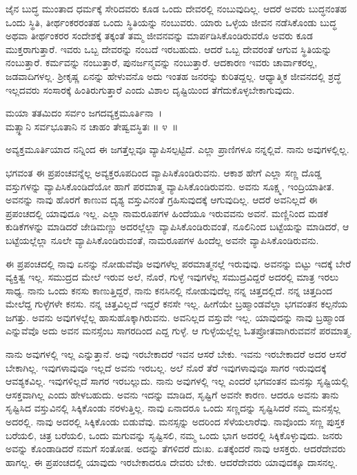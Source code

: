 ಜೈನ ಬುದ್ಧ ಮುಂತಾದ ಧರ್ಮಕ್ಕೆ ಸೇರಿದವರು ಕೂಡ ಒಂದು ದೇವರಲ್ಲಿ ನಂಬುವುದಿಲ್ಲ. ಆದರೆ ಅವರು ಬುದ್ಧನಂತಹ ಒಂದು ಸ್ಥಿತಿ, ತೀರ್ಥಂಕರರಂತಹ ಒಂದು ಸ್ಥಿತಿಯನ್ನು ನಂಬುವರು. ಯಾರು ಒಳ್ಳೆಯ ಜೀವನ ನಡೆಸಿಕೊಂಡು ಬುದ್ಧ ಅಥವಾ ತೀರ್ಥಂಕರರ ಸಂದೇಶಕ್ಕೆ ತಕ್ಕಂತೆ ತಮ್ಮ ಜೀವನವನ್ನು ಮಾರ್ಪಡಿಸಿಕೊಂಡಿರುವರೊ ಅವರು ಕೂಡ ಮುಕ್ತರಾಗುತ್ತಾರೆ. ಇವರು ಒಬ್ಬ ದೇವರನ್ನು ನಂಬದೆ ಇರಬಹುದು. ಆದರೆ ಒಬ್ಬ ದೇವರಂತೆ ಆಗುವ ಸ್ಥಿತಿಯನ್ನು ನಂಬುತ್ತಾರೆ. ಕರ್ಮವನ್ನು ನಂಬುತ್ತಾರೆ, ಪುನರ್ಜನ್ಮವನ್ನು ನಂಬುತ್ತಾರೆ. ಆದಕಾರಣ ಇವರು ಚಾರ್ವಾಕರಲ್ಲ, ಜಡವಾದಿಗಳಲ್ಲ. ಶ‍್ರೀಕೃಷ್ಣ ಏನನ್ನು ಹೇಳುವನೊ ಅದು ಇಂತಹ ಜನರನ್ನು ಕುರಿತದ್ದಲ್ಲ. ಆಧ್ಯಾತ್ಮಿಕ ಜೀವನದಲ್ಲಿ ಶ್ರದ್ಧೆ ಇಲ್ಲದವರು ಸಂಸಾರಕ್ಕೆ ಹಿಂತಿರುಗುತ್ತಾರೆ ಎಂದು ವಿಶಾಲ ದೃಷ್ಟಿಯಿಂದ ತೆಗೆದುಕೊಳ್ಳಬೇಕಾಗುವುದು.

\begin{shloka}
ಮಯಾ ತತಮಿದಂ ಸರ್ವಂ ಜಗದವ್ಯಕ್ತಮೂರ್ತಿನಾ~।\\ಮತ್ಸ್ಥಾನಿ ಸರ್ವಭೂತಾನಿ ನ ಚಾಹಂ ತೇಷ್ವವಸ್ಥಿತಃ \hfill॥ ೪~॥
\end{shloka}

\begin{artha}
ಅವ್ಯಕ್ತಮೂರ್ತಿಯಾದ ನನ್ನಿಂದ ಈ ಜಗತ್ತೆಲ್ಲವೂ ವ್ಯಾಪಿಸಲ್ಪಟ್ಟಿದೆ. ಎಲ್ಲಾ ಪ್ರಾಣಿಗಳೂ ನನ್ನಲ್ಲಿವೆ. ನಾನು ಅವುಗಳಲ್ಲಿಲ್ಲ.
\end{artha}

ಭಗವಂತ ಈ ಪ್ರಪಂಚವನ್ನೆಲ್ಲ ಅವ್ಯಕ್ತರೂಪದಿಂದ ವ್ಯಾಪಿಸಿಕೊಂಡಿರುವನು. ಆಕಾಶ ಹೇಗೆ ಎಲ್ಲಾ ಸಣ್ಣ ದೊಡ್ಡ ವಸ್ತುಗಳನ್ನು ವ್ಯಾಪಿಸಿಕೊಂಡಿದೆಯೋ ಹಾಗೆ ಪರಮಾತ್ಮ ವ್ಯಾಪಿಸಿಕೊಂಡಿರುವನು. ಅವನು ಸೂಕ್ಷ್ಮ, ಇಂದ್ರಿಯಾತೀತ. ಅವನನ್ನು ನಾವು ಹೊರಗೆ ಕಾಣುವ ದೃಶ್ಯ ವಸ್ತುವಿನಂತೆ ಗ್ರಹಿಸುವುದಕ್ಕೆ ಆಗುವುದಿಲ್ಲ. ಆದರೆ ಅವನಿಲ್ಲದೆ ಈ ಪ್ರಪಂಚದಲ್ಲಿ ಯಾವುದೂ ಇಲ್ಲ. ಎಲ್ಲಾ ನಾಮರೂಪಗಳ ಹಿಂದೆಯೂ ಇರುವವನು ಅವನೆ. ಮಣ್ಣಿನಿಂದ ಮಡಕೆ ಕುಡಿಕೆಗಳನ್ನು ಮಾಡಿದರೆ ಜೇಡಿಮಣ್ಣು ಅದರಲ್ಲೆಲ್ಲಾ ವ್ಯಾಪಿಸಿಕೊಂಡಿರುವಂತೆ, ನೂಲಿನಿಂದ ಬಟ್ಟೆಯನ್ನು ಮಾಡಿದರೆ, ಆ ಬಟ್ಟೆಯಲ್ಲೆಲ್ಲಾ ನೂಲೇ ವ್ಯಾಪಿಸಿಕೊಂಡಿರುವಂತೆ, ನಾಮರೂಪಗಳ ಹಿಂದೆಲ್ಲ ಅವನೇ ವ್ಯಾಪಿಸಿ\-ಕೊಂಡಿರುವನು.

ಈ ಪ್ರಪಂಚದಲ್ಲಿ ನಾವು ಏನನ್ನು ನೋಡುವೆವೊ ಅವುಗಳೆಲ್ಲ ಪರಮಾತ್ಮನಲ್ಲೆ ಇರುವುವು. ಅವನನ್ನು ಬಿಟ್ಟು ಇದಕ್ಕೆ ಬೇರೆ ವ್ಯಕ್ತಿತ್ವ ಇಲ್ಲ. ಸಮುದ್ರದ ಮೇಲೆ ಇರುವ ಅಲೆ, ನೊರೆ, ಗುಳ್ಳೆ ಇವುಗಳೆಲ್ಲ ಸಮುದ್ರವಿದ್ದರೆ ಅದರಲ್ಲಿ ಮಾತ್ರ ಇರಲು ಸಾಧ್ಯ. ನಾನು ಒಂದು ಕನಸು ಕಾಣುತ್ತಿದ್ದರೆ, ನಾನು ಕನಸಿನಲ್ಲಿ ನೋಡುವುದೆಲ್ಲ ನನ್ನ ಚಿತ್ತದಲ್ಲಿದೆ. ನನ್ನ ಚಿತ್ತದಿಂದ ಮೇಲೆದ್ದ ಗುಳ್ಳೆಗಳೇ ಕನಸು. ನನ್ನ ಚಿತ್ತವಿಲ್ಲದೆ ಇದ್ದರೆ ಕನಸೇ ಇಲ್ಲ. ಹೀಗೆಯೇ ಬ್ರಹ್ಮಾಂಡವೆಲ್ಲಾ ಭಗವಂತನ ಕಲ್ಪನೆಯ ಜಗತ್ತು. ಅವನು ಅವುಗಳಲ್ಲೆಲ್ಲ ಹಾಸುಹೊಕ್ಕಾಗಿರುವನು. ಅವನಿಲ್ಲದ ವಸ್ತುವೇ ಇಲ್ಲ. ಯಾವುದನ್ನು ನಾವು ಬ್ರಹ್ಮಾಂಡ ಎನ್ನುವೆವೊ ಅದು ಅವನ ಮನಸ್ಸೆಂಬ ಸಾಗರದಿಂದ ಎದ್ದ ಗುಳ್ಳೆ. ಆ ಗುಳ್ಳೆಯಲ್ಲೆಲ್ಲ ಓತಪ್ರೋತವಾಗಿರುವವನೆ ಪರಮಾತ್ಮ.

ನಾನು ಅವುಗಳಲ್ಲಿ ಇಲ್ಲ ಎನ್ನುತ್ತಾನೆ. ಅವು ಇರಬೇಕಾದರೆ ಇವನ ಆಸರೆ ಬೇಕು. ಇವನು ಇರಬೇಕಾದರೆ ಅದರ ಆಸರೆ ಬೇಕಾಗಿಲ್ಲ. ಇವುಗಳಾವುವೂ ಇಲ್ಲದೆ ಅವನು ಇರಬಲ್ಲ. ಅಲೆ ನೊರೆ ತೆರೆ ಇವುಗಳಾವುವೂ ಸಾಗರ ಇರುವುದಕ್ಕೆ ಆವಶ್ಯಕವಿಲ್ಲ. ಇವುಗಳಿಲ್ಲದೆ ಸಾಗರ ಇರಬಲ್ಲುದು. ನಾನು ಅವುಗಳಲ್ಲಿ ಇಲ್ಲ ಎಂದರೆ ಭಗವಂತನ ಮನಸ್ಸು ಸೃಷ್ಟಿಯಲ್ಲಿ ಆಸಕ್ತವಾಗಿಲ್ಲ ಎಂದು ಹೇಳಬಹುದು. ಅವನು ಇದನ್ನು ಮಾಡಿದ, ಸೃಷ್ಟಿಗೆ ಅವನೇ ಕಾರಣ. ಆದರೂ ಅವನು ತಾನು ಸೃಷ್ಟಿಸಿದ ವಸ್ತುವಿನಲ್ಲಿ ಸಿಕ್ಕಿಕೊಂಡು ನರಳುತ್ತಿಲ್ಲ. ನಾವು ಏನಾದರೂ ಒಂದು ಸಣ್ಣದನ್ನು ಸೃಷ್ಟಿಸಿದರೆ ನಮ್ಮ ಮನಸ್ಸೆಲ್ಲ ಅದರಲ್ಲಿ. ನಾವು ಅದರಲ್ಲಿ ಸಿಕ್ಕಿಕೊಂಡು ಬಿಡುವೆವು. ಮನಸ್ಸನ್ನು ಅದರಿಂದ ಸೆಳೆಯಲಾರೆವು. ನಾವೊಂದು ಸಣ್ಣ ಪುಸ್ತಕ ಬರೆಯಲಿ, ಚಿತ್ರ ಬರೆಯಲಿ, ಒಂದು ಮಗುವನ್ನು ಸೃಷ್ಟಿಸಲಿ, ನಮ್ಮ ಒಂದು ಭಾಗ ಅದರಲ್ಲಿ ಸಿಕ್ಕಿಕೊಳ್ಳುವುದು. ಜನರು ಅವನ್ನು ಕೊಂಡಾಡಿದರೆ ನಮಗೆ ಸಂತೋಷ. ಅದನ್ನು ತೆಗಳಿದರೆ ದುಃಖ. ಏತಕ್ಕೆಂದರೆ ನಾವು ಆಸಕ್ತರು. ಆದರೆ\break ದೇವರು ಹಾಗಲ್ಲ. ಈ ಪ್ರಪಂಚದಲ್ಲಿ ಯಾವುದು ಇರಬೇಕಾದರೂ ದೇವರು ಬೇಕು. ಆದರೆ\break ದೇವರು ಯಾವುದಕ್ಕೂ ದಾಸನಲ್ಲ.

